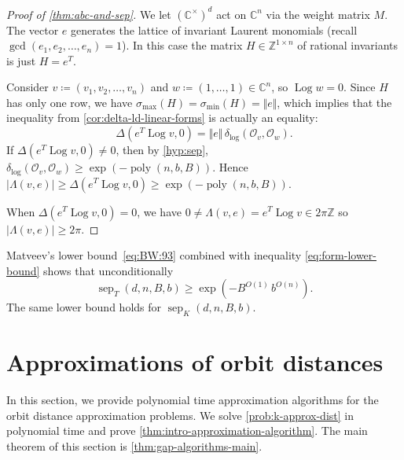 \documentclass[a4paper,USenglish,cleveref,numberwithinsect]{lipics-v2021}
\DeclareMathOperator{\poly}{poly}
\DeclareMathOperator{\sep}{sep}
\DeclareMathOperator{\Log}{Log}
\newcommand{\distLD}{\delta_{\log}}
\newcommand{\CC}{\mathbb{C}}
\newcommand{\ZZ}{\mathbb{Z}}
\newcommand{\OO}{\ensuremath{\mathcal{O}}}
\numberwithin{equation}{section}
\begin{document}
\begin{proof}[Proof of \cref{thm:abc-and-sep}]
We let $(\CC^\times)^d$ act on $\CC^n$ via the weight matrix $M$.
The vector $e$ generates the lattice of invariant Laurent monomials
(recall $\gcd(e_1,e_2,\dots,e_n)=1$).
In this case the matrix $H\in\ZZ^{1\times n}$ of rational invariants is just $H=e^T$.

Consider $v\coloneqq (v_1,v_2,\dots,v_n)$ and
$w\coloneqq (1,\ldots,1) \in\CC^n$, so $\Log w =0$.
Since $H$ has only one row, we have $\sigma_{\max}(H)=\sigma_{\min}(H)=\Vert e\Vert$,
which implies that the inequality from \cref{cor:delta-ld-linear-forms}
is actually an equality:
\begin{equation}\label{eq:Delta-delta}
  \Delta(e^T\Log v, 0) = \Vert e\Vert\,\distLD(\OO_v,\OO_w).
\end{equation}
If $\Delta(e^T\Log v, 0) \ne 0$, then by
\cref{hyp:sep},
$\distLD(\OO_v,\OO_w) \ge \exp(-\poly(n,b,B))$.
Hence
$|\Lambda(v,e)| \geq \Delta(e^T\Log v,0)\ge \exp(-\poly(n,b,B))$.

When $\Delta(e^T\Log v, 0) =0$, we have
$0 \ne \Lambda(v,e) = e^T\Log v \in 2\pi\ZZ$ so $|\Lambda(v,e)| \ge 2\pi$.
\end{proof}

\begin{remark}
Matveev's lower bound~\eqref{eq:BW:93}
combined with inequality \cref{eq:form-lower-bound}
shows that unconditionally
\[
   \sep_T(d,n,B,b)\geq \exp( - B^{O(1)}\, b^{O(n)}) .
\]
The same lower bound holds for $\sep_K(d,n,B,b)$.
\end{remark}

\section{Approximations of orbit distances}\label{sec:main-approx}

In this section, we provide polynomial time approximation algorithms
for the orbit distance approximation problems.
We solve \cref{prob:k-approx-dist} in polynomial time and prove
\cref{thm:intro-approximation-algorithm}.
The main theorem of this section is \cref{thm:gap-algorithms-main}.

\end{document}
